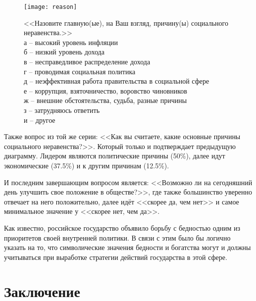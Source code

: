 \begin{figure}[h]
    \centering
    \texttt{[image: reason]} \\
    \caption{<<Назовите главную(ые), на Ваш взгляд, причину(ы) социального 
        неравенства.>> \\
        а -- высокий уровень инфляции \\
        б -- низкий уровень дохода \\
        в -- несправедливое распределение дохода \\
        г -- проводимая социальная политика \\
        д -- неэффективная работа правительства в социальной сфере \\
        е -- коррупция, взяточничество, воровство чиновников \\
        ж -- внешние обстоятельства, судьба, разные причины \\
        з -- затрудняюсь ответить \\
        и -- другое
    }
\end{figure}

Также вопрос из той же серии: <<Как вы считаете, какие основные причины 
социального неравенства?>>. Который только и подтверждает предыдущую диаграмму.
Лидером являются политические причины (50\%), далее идут экономические 
(37.5\%) и к другим причинам (12.5\%).

И последним завершающим вопросом является: <<Возможно ли на сегодняшний день 
улучшить свое положение в обществе?>>, где также большинство уверенно отвечает 
на него положительно, далее идёт <<скорее да, чем нет>> и самое минимальное 
значение у <<скорее нет, чем да>>.

Как известно, российское государство объявило борьбу с бедностью одним из 
приоритетов своей внутренней политики. В связи с этим было бы логично указать 
на то, что символические значения бедности и богатства могут и должны 
учитываться при выработке стратегии действий государства в этой сфере.

\newpage

\section*{Заключение}

